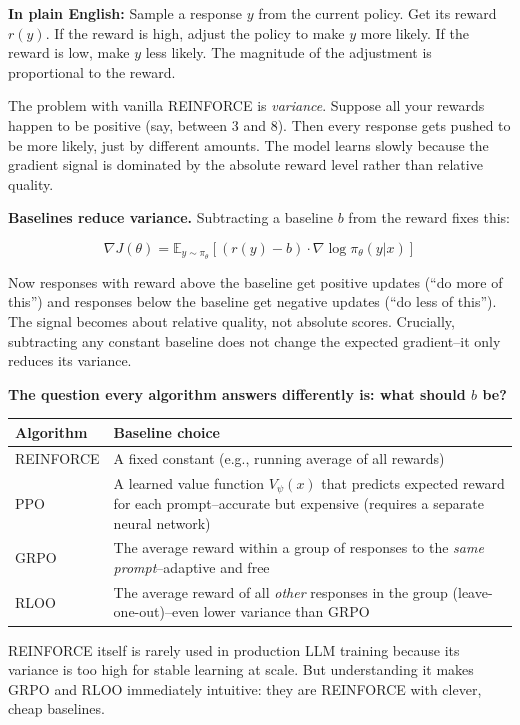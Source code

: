 \begin{chapterenv}
\begin{infobox}
\textbf{In plain English:} Sample a response $y$ from the current policy. Get its reward $r(y)$. If the reward is high, adjust the policy to make $y$ more likely. If the reward is low, make $y$ less likely. The magnitude of the adjustment is proportional to the reward.
\end{infobox}

The problem with vanilla REINFORCE is \textit{variance}. Suppose all your rewards happen to be positive (say, between 3 and 8). Then every response gets pushed to be more likely, just by different amounts. The model learns slowly because the gradient signal is dominated by the absolute reward level rather than relative quality.

\textbf{Baselines reduce variance.} Subtracting a baseline $b$ from the reward fixes this:

$$\nabla J(\theta) = \mathbb{E}_{y \sim \pi_\theta}\!\left[(r(y) - b) \cdot \nabla \log \pi_\theta(y|x)\right]$$

Now responses with reward above the baseline get positive updates (``do more of this'') and responses below the baseline get negative updates (``do less of this''). The signal becomes about relative quality, not absolute scores. Crucially, subtracting any constant baseline does not change the expected gradient--it only reduces its variance.

\textbf{The question every algorithm answers differently is: what should $b$ be?}

\begin{center}
\begin{tabular}{lp{}}
\toprule
\textbf{Algorithm} & \textbf{Baseline choice} \\
\midrule
REINFORCE & A fixed constant (e.g., running average of all rewards) \\
PPO & A learned value function $V_\psi(x)$ that predicts expected reward for each prompt--accurate but expensive (requires a separate neural network) \\
GRPO & The average reward within a group of responses to the \textit{same prompt}--adaptive and free \\
RLOO & The average reward of all \textit{other} responses in the group (leave-one-out)--even lower variance than GRPO \\
\bottomrule
\end{tabular}
\end{center}

REINFORCE itself is rarely used in production LLM training because its variance is too high for stable learning at scale. But understanding it makes GRPO and RLOO immediately intuitive: they are REINFORCE with clever, cheap baselines.


\end{chapterenv}

